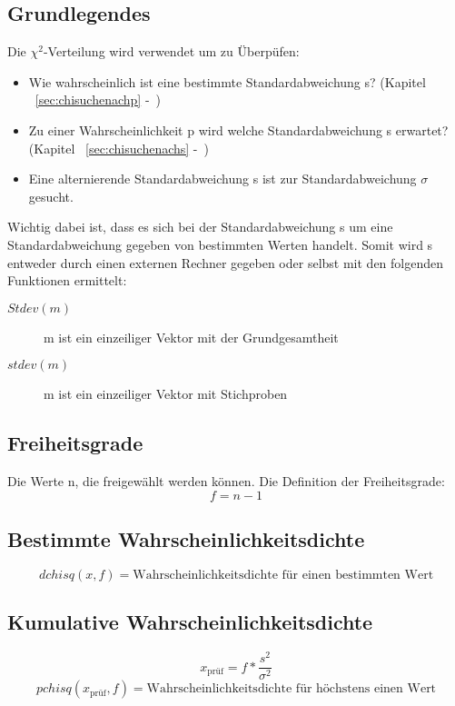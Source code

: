 \documentclass[a4paper,10pt]{article}
\begin{document}
\subsection{Grundlegendes}
\label{sec:chiquadratverteilunggrundlegendes}
Die $ \chi ^2 $-Verteilung wird verwendet um zu Überpüfen:
\begin{itemize}
\item Wie wahrscheinlich ist eine bestimmte Standardabweichung s?
  (Kapitel ~\autoref{sec:chisuchenachp} -~)
\item Zu einer Wahrscheinlichkeit p wird welche Standardabweichung s
  erwartet? (Kapitel ~\autoref{sec:chisuchenachs}
  -~)
\item Eine alternierende Standardabweichung s ist zur
  Standardabweichung $ \sigma $ gesucht.
\end{itemize}

Wichtig dabei ist, dass es sich bei der Standardabweichung s um eine
Standardabweichung gegeben von bestimmten Werten handelt. Somit wird s
entweder durch einen externen Rechner gegeben oder selbst mit den
folgenden Funktionen ermittelt:
\begin{description}
\item[$ Stdev(m) $] m ist ein einzeiliger Vektor mit der Grundgesamtheit
\item[$ stdev(m) $] m ist ein einzeiliger Vektor mit Stichproben
\end{description}

\subsection{Freiheitsgrade}
Die Werte n, die freigewählt werden können. Die Definition der Freiheitsgrade:
\begin{equation}
  f = n - 1
\end{equation}

\subsection{Bestimmte Wahrscheinlichkeitsdichte}
\label{sec:bestimmtewahrscheinlichkeitsdichte}
\begin{equation}
  dchisq(x, f) = \text{Wahrscheinlichkeitsdichte für einen bestimmten Wert}
\end{equation}

\subsection{Kumulative Wahrscheinlichkeitsdichte}
\label{sec:kumulativewahrscheinlichkeitsdichte}
\begin{equation}
    x_{\text{prüf}} = f * \frac{s^2}{\sigma^2}
\end{equation}
\begin{equation}
  pchisq(x_{\text{prüf}}, f) = \text{Wahrscheinlichkeitsdichte für höchstens einen Wert}
\end{equation}
\end{document}
